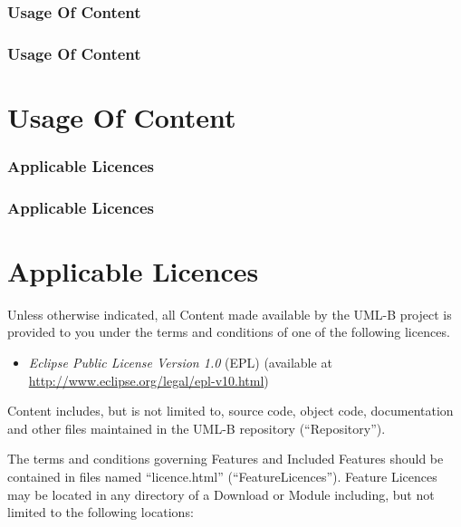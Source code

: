 
\ifplastex
\subsubsection{Usage Of Content}
\label{sec:usage-content}
\else
  \ifstandalone
  \subsubsection{Usage Of Content}
  \label{sec:usage-content}
  \else
  \section{Usage Of Content}
  \label{sec:usage-content}
  \fi
\fi



\ifplastex
\subsubsection{Applicable Licences}
\label{sec:vhdl-applicable-licences}
\else
  \ifstandalone
  \subsubsection{Applicable Licences}
  \label{sec:vhdl-applicable-licences}
  \else
  \section{Applicable Licences}
  \label{sec:vhdl-applicable-licences}
  \fi
\fi
 
Unless otherwise indicated, all Content made available by the UML-B project is provided to you under the terms and conditions of one of
the following licences.

\begin{itemize}
\item \emph{Eclipse Public License Version 1.0} (EPL) (available at 
   \url{http://www.eclipse.org/legal/epl-v10.html})
\end{itemize}

Content includes, but is not limited to, source code, object code, documentation and other files maintained in the UML-B repository (``Repository'').

The terms and conditions governing Features and Included Features should be contained in files named ``licence.html'' (``FeatureLicences'').  
Feature Licences may be located in any directory of a Download or Module including, but not limited to the following locations:

